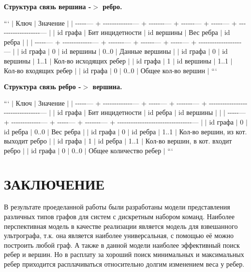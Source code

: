 \begin{DoxyEnumerate}
\item {\bfseries Структура связь вершина -\/$>$ ребро.}

``` $\vert$ Ключ $\vert$ Значение $\vert$ $\vert$ -\/-\/-\/-\/-\/--- + -\/-\/-\/-\/-\/-\/-\/-\/-\/-\/-\/-\/-\/--- + -\/-\/-\/-\/-\/-\/-\/--- + -\/-\/-\/-\/-\/-\/--- + -\/-\/-\/-\/-\/--- + -\/-\/-\/-\/-\/-\/-\/-\/-\/-\/-\/-\/-\/-\/-\/-\/-\/-\/-\/--- $\vert$ $\vert$ id графа $\vert$ Бит инцидетности $\vert$ id вершины $\vert$ Вес ребра $\vert$ id ребра $\vert$ $\vert$ $\vert$ -\/-\/-\/-\/-\/--- + -\/-\/-\/-\/-\/-\/-\/-\/-\/-\/-\/-\/-\/--- + -\/-\/-\/-\/-\/-\/-\/--- + -\/-\/-\/-\/-\/-\/--- + -\/-\/-\/-\/-\/--- + -\/-\/-\/-\/-\/-\/-\/-\/-\/-\/-\/-\/-\/-\/-\/-\/-\/-\/-\/--- $\vert$ $\vert$ id графа $\vert$ 0 $\vert$ id вершины $\vert$ 0..0 $\vert$ Данные вершины $\vert$ $\vert$ id графа $\vert$ 0 $\vert$ id вершины $\vert$ 1..1 $\vert$ Кол-\/во исходящих ребер $\vert$ $\vert$ id графа $\vert$ 1 $\vert$ id вершины $\vert$ 1..1 $\vert$ Кол-\/во входящих ребер $\vert$ $\vert$ id графа $\vert$ 0 $\vert$ 0..0 $\vert$ Общее кол-\/во вершин $\vert$ ```
\item {\bfseries Структура связь ребро -\/$>$ вершина.}

``` $\vert$ Ключ $\vert$ Значение $\vert$ $\vert$ -\/-\/-\/-\/-\/--- + -\/-\/-\/-\/-\/-\/-\/-\/-\/-\/-\/-\/-\/--- + -\/-\/-\/-\/-\/--- + -\/-\/-\/-\/-\/-\/-\/--- + -\/-\/-\/-\/-\/-\/-\/-\/-\/-\/-\/-\/-\/-\/-\/-\/-\/-\/-\/-\/-\/-\/-\/-\/-\/-\/-\/-\/-\/-\/-\/-\/-\/--- $\vert$ $\vert$ id графа $\vert$ Бит инцидетности $\vert$ id ребра $\vert$ id вершины $\vert$ $\vert$ $\vert$ -\/-\/-\/-\/-\/--- + -\/-\/-\/-\/-\/-\/-\/-\/-\/-\/-\/-\/-\/--- + -\/-\/-\/-\/-\/--- + -\/-\/-\/-\/-\/-\/-\/--- + -\/-\/-\/-\/-\/-\/-\/-\/-\/-\/-\/-\/-\/-\/-\/-\/-\/-\/-\/-\/-\/-\/-\/-\/-\/-\/-\/-\/-\/-\/-\/-\/-\/--- $\vert$ $\vert$ id графа $\vert$ 0 $\vert$ id ребра $\vert$ 0..0 $\vert$ Вес ребра $\vert$ $\vert$ id графа $\vert$ 0 $\vert$ id ребра $\vert$ 1..1 $\vert$ Кол-\/во вершин, из кот. выходит ребро $\vert$ $\vert$ id графа $\vert$ 1 $\vert$ id ребра $\vert$ 1..1 $\vert$ Кол-\/во вершин, в кот. входит ребро $\vert$ $\vert$ id графа $\vert$ 0 $\vert$ 0..0 $\vert$ Общее количество ребер $\vert$ ```
\end{DoxyEnumerate}\hypertarget{md_docs__xD0_x93_xD1_x80_xD0_xB0_xD1_x84_xD0_xBE_xD0_xB2_xD1_x8B_xD0_xB5__xD0_xBC_xD0_xBE_xD0_xB4_xD0_xB5_xD0_xBB_xD0_xB8_autotoc_md13}{}\section{ЗАКЛЮЧЕНИЕ}\label{md_docs__xD0_x93_xD1_x80_xD0_xB0_xD1_x84_xD0_xBE_xD0_xB2_xD1_x8B_xD0_xB5__xD0_xBC_xD0_xBE_xD0_xB4_xD0_xB5_xD0_xBB_xD0_xB8_autotoc_md13}
В результате проеделанной работы были разработаны модели представления различных типов графов для систем с дискретным набором команд. Наиболее перспективная модель в качестве реализации является модель для взвешанного ультрографа, т.\+к. она является наиболее универсальная, с помощью её можно построить любой граф. А также в данной модели наиболее эффективный поиск ребер и вершин. Но в расплату за хороший поиск минимальных и максимальных ребер приходится расплачиваться относительно долгим изменением веса у ребер. 